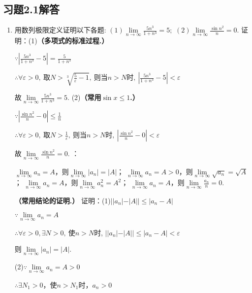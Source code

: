 \documentclass[12pt,UTF8]{ctexart}
\begin{document}
\subsection{习题2.1解答}
\begin{enumerate}
\item 用数列极限定义证明以下各题:
\newline
$(1)\lim\limits_{n\rightarrow\infty}\frac{5n^3}{1+n^3}=5;$
\newline
$(2)\lim\limits_{n\rightarrow\infty}\frac{\sin n^2}{n}=0.$
\newline
证明：(1){\bf（多项式的标准过程.）}

$\because|\frac{5n^3}{1+n^3}-5|=\frac{5}{1+n^3}$

$\therefore\forall\varepsilon>0,\ \text{取} N>\sqrt[3]{\frac5\varepsilon-1},\ \text{则当}n>N\text{时},\ |\frac{5n^3}{1+n^3}-5|<\varepsilon$

故$\lim\limits_{n\rightarrow\infty}\frac{5n^3}{1+n^3}=5$.
\newline
(2){\bf（常用$\sin x\leq1$.）}

$\because|\frac{\sin n^2}{n}-0|\leq\frac1{n}$

$\therefore\forall\varepsilon>0,\ \text{取}N>\frac1\varepsilon,\ \text{则当}n>N\text{时},\ |\frac{\sin n^2}{n}-0|<\varepsilon$

故$\lim\limits_{n\rightarrow\infty}\frac{\sin n^2}{n}=0$.
：
\begin{enumerate}[(1)]
	$\lim\limits_{n\rightarrow\infty}a_n=A$，则$\lim\limits_{n\rightarrow\infty}|a_n|=|A|$；
	$\lim\limits_{n\rightarrow\infty}a_n=A>0$，则$\lim\limits_{n\rightarrow\infty}\sqrt{a_n}=\sqrt{A}$；
	$\lim\limits_{n\rightarrow\infty}a_n=A$，则$\lim\limits_{n\rightarrow\infty}a_n^2=A^2$；
	$\lim\limits_{n\rightarrow\infty}a_n=A$，则$\lim\limits_{n\rightarrow\infty}\frac{a_n}n=0$.
\end{enumerate}
{\bf（常用结论的证明.）}
\newline
证明：(1)$||a_n|-|A||\leq|a_n-A|$

$\because\lim\limits_{n\rightarrow\infty}a_n=A$

$\therefore\forall\varepsilon>0,\exists N>0,\ \text{使}n>N$时, $||a_n|-|A||\leq|a_n-A|<\varepsilon$

则$\lim\limits_{n\rightarrow\infty}|a_n|=|A|$.


(2)$\because\lim\limits_{n\rightarrow\infty}a_n=A>0$

$\therefore\exists N_1>0$，使$n>N_1$时，$a_n>0$


\end{enumerate}
\end{document}
